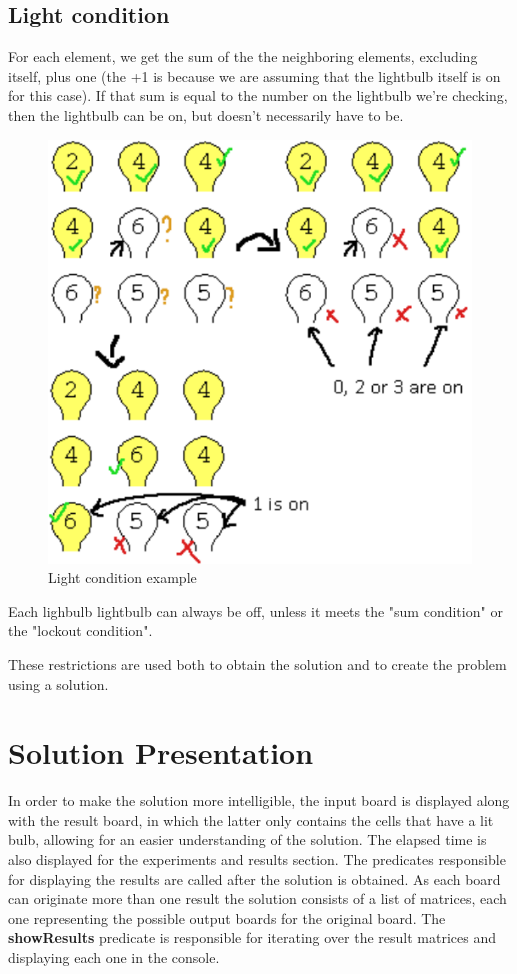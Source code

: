 \documentclass[runningheads]{llncs}
\begin{document}
\subsection*{Light condition}
For each element, we get the sum of the the neighboring elements, excluding itself, plus one (the +1 is because we are assuming that the lightbulb itself is on for this case).
If that sum is equal to the number on the lightbulb we're checking, then the lightbulb can be on, but doesn't necessarily have to be.

\begin{figure}
	\includegraphics[scale=0.5]{lightbulb_light_condition_example}
	\centering
	\caption{Light condition example}
	\centering
	\end{figure}

Each lighbulb lightbulb can always be off, unless it meets the "sum condition" or the "lockout condition".

These restrictions are used both to obtain the solution and to create the problem using a solution.

\clearpage
\section{Solution Presentation}
In order to make the solution more intelligible, the input board is displayed along with the result board, in which the latter
only contains the cells that have a lit bulb, allowing for an easier understanding of the solution. The elapsed time is also displayed for the experiments and results section.
The predicates responsible for displaying the results are called after the solution is obtained. As each board can originate more than one result the solution consists of a list of matrices, each one representing the possible output boards for the original board. The \textbf{showResults} predicate is responsible for iterating over the result matrices and displaying each one in the console.
\end{document}
